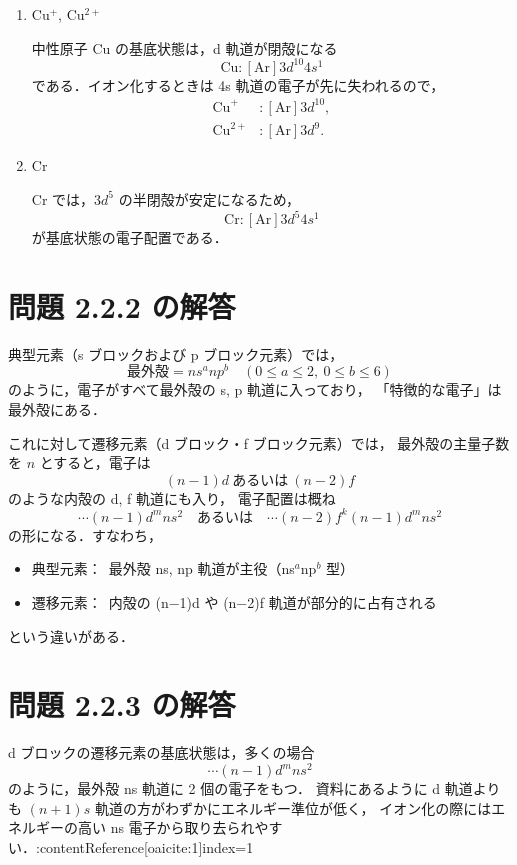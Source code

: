 \documentclass[a4paper,12pt]{jlreq}
\begin{document}
\begin{enumerate}
  \item Cu$^+$, Cu$^{2+}$

  中性原子 Cu の基底状態は，d 軌道が閉殻になる
  \[
    \mathrm{Cu}: [\mathrm{Ar}]3d^{10}4s^1
  \]
  である．イオン化するときは 4s 軌道の電子が先に失われるので，
  \begin{align*}
    \mathrm{Cu}^+ &: [\mathrm{Ar}]3d^{10},\\
    \mathrm{Cu}^{2+} &: [\mathrm{Ar}]3d^{9}.
  \end{align*}

  \item Cr

  Cr では，$3d^5$ の半閉殻が安定になるため，
  \[
    \mathrm{Cr}: [\mathrm{Ar}]3d^{5}4s^1
  \]
  が基底状態の電子配置である．
\end{enumerate}

\section*{問題 2.2.2 の解答}

典型元素（s ブロックおよび p ブロック元素）では，  
\[
\text{最外殻} = n s^{a} n p^{b} \quad (0 \le a \le 2,\ 0 \le b \le 6)
\]
のように，電子がすべて最外殻の s, p 軌道に入っており，
「特徴的な電子」は最外殻にある．

これに対して遷移元素（d ブロック・f ブロック元素）では，
最外殻の主量子数を $n$ とすると，電子は
\[
(n-1)d \ \text{あるいは}\ (n-2)f
\]
のような内殻の d, f 軌道にも入り，  
電子配置は概ね
\[
\cdots (n-1)d^{m}n s^{2}
\quad \text{あるいは}\quad
\cdots (n-2)f^{k}(n-1)d^{m}n s^{2}
\]
の形になる．すなわち，
\begin{itemize}
  \item 典型元素：\ 最外殻 ns, np 軌道が主役（ns$^a$np$^b$ 型）
  \item 遷移元素：\ 内殻の (n−1)d や (n−2)f 軌道が部分的に占有される
\end{itemize}
という違いがある．

\section*{問題 2.2.3 の解答}

d ブロックの遷移元素の基底状態は，多くの場合
\[
\cdots (n-1)d^{m}n s^2
\]
のように，最外殻 ns 軌道に 2 個の電子をもつ．  
資料にあるように d 軌道よりも $(n+1)s$ 軌道の方がわずかにエネルギー準位が低く，
イオン化の際にはエネルギーの高い ns 電子から取り去られやすい．:contentReference[oaicite:1]{index=1}
\end{document}
